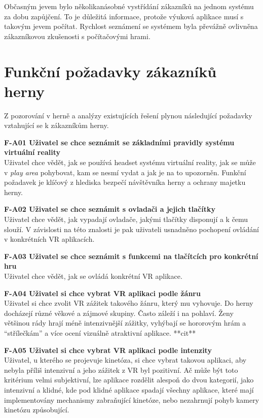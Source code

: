 Občasným jevem bylo několikanásobné vystřídání zákazníků na jednom
systému za dobu zapůjčení. To je důležitá informace, protože výuková
aplikace musí s takovým jevem počítat. Rychlost seznámení se systémem
byla převážně ovlivněna zákazníkovou zkušenosti s počítačovými hrami.

\section{Funkční požadavky zákazníků
herny}\label{funkux10dnuxed-poux17eadavky-zakazniku-herny}

Z pozorování v herně a analýzy existujících řešení plynou následující
požadavky vztahující se k zákazníkům herny.

\textbf{F-A01 Uživatel se chce seznámit se základními pravidly systému
virtuální reality}\\
Uživatel chce vědět, jak se používá headset systému virtuální reality,
jak se může v \emph{play area} pohybovat, kam se nesmí vydat a jak je na
to upozorněn. Funkční požadavek je klíčový z hlediska bezpečí
návštěvníka herny a ochrany majetku herny.

\textbf{F-A02 Uživatel se chce seznámit s ovladači a jejich tlačítky}\\
Uživatel chce vědět, jak vypadají ovladače, jakými tlačítky disponují a
k čemu slouží. V závislosti na této znalosti je pak uživateli usnadněno
pochopení ovládání v konkrétních VR aplikacích.

\textbf{F-A03 Uživatel se chce seznámit s funkcemi na tlačítcích pro
konkrétní hru}\\
Uživatel chce vědět, jak se ovládá konkrétní VR aplikace.

\textbf{F-A04 Uživatel si chce vybrat VR aplikaci podle žánru}\\
Uživatel si chce zvolit VR zážitek takového žánru, který mu vyhovuje. Do
herny docházejí různé věkové a zájmové skupiny. Často záleží i na
pohlaví. Ženy většinou rády hrají méně intenzivnější zážitky, vyhýbají
se hororovým hrám a ``střílečkám'' a více ocení vizuálně atraktivní
aplikace. **cit**

\textbf{F-A05 Uživatel si chce vybrat VR aplikaci podle intenzity}\\
Uživatel, u kterého se projevuje kinetóza, si chce vybrat takovou
aplikaci, aby nebyla příliš intenzivní a jeho zážitek z VR byl
pozitivní. Ač může být toto kritérium velmi subjektivní, lze aplikace
rozdělit alespoň do dvou kategorií, jako intenzivní a klidné, kde pod
klidné aplikace spadají všechny aplikace, které mají implementovány
mechanismy zabraňující kinetóze, nebo nezahrnují pohyb kamery kinetózu
způsobující.

